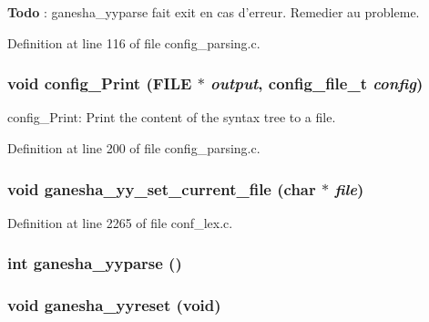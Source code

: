 \begin{Desc}
\item[{\bf Todo}]: ganesha\_\-yyparse fait exit en cas d'erreur. Remedier au probleme. \end{Desc}


Definition at line 116 of file config\_\-parsing.c.
\subsubsection[{config\_\-Print}]{\setlength{\rightskip}{0pt plus 5cm}void config\_\-Print (FILE $\ast$ {\em output}, \/  config\_\-file\_\-t {\em config})}\label{config__parsing_8c_ff7eca609d048b1c63fb5dbe460cbff9}


config\_\-Print: Print the content of the syntax tree to a file. 

Definition at line 200 of file config\_\-parsing.c.
\subsubsection[{ganesha\_\-yy\_\-set\_\-current\_\-file}]{\setlength{\rightskip}{0pt plus 5cm}void ganesha\_\-yy\_\-set\_\-current\_\-file (char $\ast$ {\em file})}\label{config__parsing_8c_241dd44a224c242b3bc3fd52122d2537}




Definition at line 2265 of file conf\_\-lex.c.
\subsubsection[{ganesha\_\-yyparse}]{\setlength{\rightskip}{0pt plus 5cm}int ganesha\_\-yyparse ()}\label{config__parsing_8c_4edadf1190387c8f45d970067dcd41a9}


\subsubsection[{ganesha\_\-yyreset}]{\setlength{\rightskip}{0pt plus 5cm}void ganesha\_\-yyreset (void)}\label{config__parsing_8c_e3a69a7654fd47eec60f20f48860edd0}




